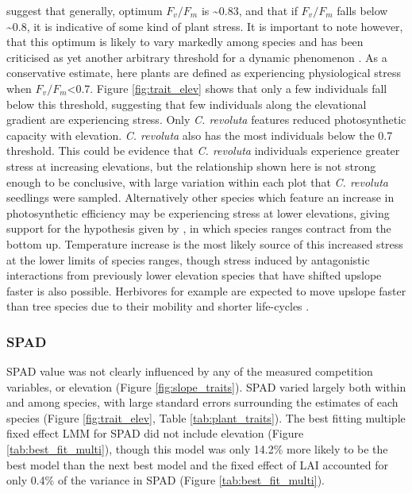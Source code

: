 \documentclass[a4paper,11pt]{article}
\begin{document}
\citet{Maxwell2000} suggest that generally, optimum $F_v/F_m$ is \textasciitilde0.83, and that if $F_v/F_m$ falls below \textasciitilde0.8, it is indicative of some kind of plant stress. It is important to note however, that this optimum is likely to vary markedly among species and has been criticised as yet another arbitrary threshold for a dynamic phenomenon \citep{Ghouil2003}. As a conservative estimate, here plants are defined as experiencing physiological stress when $F_v/F_m$<0.7. Figure \ref{fig:trait_elev} shows that only a few individuals fall below this threshold, suggesting that few individuals along the elevational gradient are experiencing stress. Only \textit{C. revoluta} features reduced photosynthetic capacity with elevation. \textit{C. revoluta} also has the most individuals below the 0.7 threshold. This could be evidence that \textit{C. revoluta} individuals experience greater stress at increasing elevations, but the relationship shown here is not strong enough to be conclusive, with large variation within each plot that \textit{C. revoluta} seedlings were sampled. Alternatively other species which feature an increase in photosynthetic efficiency may be experiencing stress at lower elevations, giving support for the hypothesis given by \citet{Campbell2007}, in which species ranges contract from the bottom up. Temperature increase is the most likely source of this increased stress at the lower limits of species ranges, though stress induced by antagonistic interactions from previously lower elevation species that have shifted upslope faster is also possible. Herbivores for example are expected to move upslope faster than tree species due to their mobility and shorter life-cycles \citep{Chen2011}.

\subsubsection*{SPAD}
SPAD value was not clearly influenced by any of the measured competition variables, or elevation (Figure \ref{fig:slope_traits}). SPAD varied largely both within and among species, with large standard errors surrounding the estimates of each species (Figure \ref{fig:trait_elev}, Table \ref{tab:plant_traits}). The best fitting multiple fixed effect LMM for SPAD did not include elevation (Figure \ref{tab:best_fit_multi}), though this model was only 14.2\% more likely to be the best model than the next best model and the fixed effect of LAI accounted for only 0.4\% of the variance in SPAD (Figure \ref{tab:best_fit_multi}). 
\end{document}
